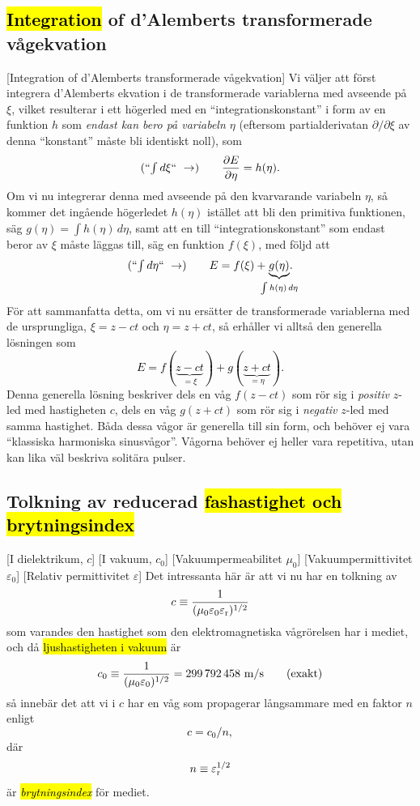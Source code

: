 \subsection{{\hl{Integration}} of d'Alemberts transformerade v{\aa}gekvation}
[Integration of d'Alemberts
  transformerade v{\aa}gekvation]
Vi v{\"a}ljer att f{\"o}rst integrera d'Alemberts ekvation i de transformerade
variablerna med avseende p{\aa} $\xi$, vilket resulterar i ett h{\"o}gerled med
en ``integrationskonstant'' i form av en funktion $h$ som {\it endast kan bero
p{\aa} variabeln $\eta$} (eftersom partialderivatan $\partial/\partial\xi$ av
denna ``konstant'' m{\aa}ste bli identiskt noll), som
\hl{$$
  (\hbox{``$\int d\xi$`` }\to)\qquad
  {{\partial E}\over{\partial\eta}}=h(\eta).
$$}
Om vi nu integrerar denna med avseende p{\aa} den kvarvarande variabeln $\eta$,
s{\aa} kommer det ing{\aa}ende h{\"o}gerledet $h(\eta)$ ist{\"a}llet att bli
den primitiva funktionen, s{\"a}g $g(\eta)=\int h(\eta)\,d\eta$, samt
att en till ``integrationskonstant'' som endast beror av $\xi$ m{\aa}ste
l{\"a}ggas till, s{\"a}g en funktion $f(\xi)$, med f{\"o}ljd att
\hl{$$
  (\hbox{``$\int d\eta$`` }\to)\qquad
  E=f(\xi)+\kern-7pt\underbrace{g(\eta)}_{\int h(\eta)\,d\eta}\kern-9pt.
$$}
F{\"o}r att sammanfatta detta, om vi nu ers{\"a}tter de transformerade
variablerna med de ursprungliga, $\xi=z-ct$ och $\eta=z+ct$, s{\aa}
erh{\aa}ller vi allts{\aa} den generella l{\"o}sningen som
\hl{$$
  E = f(\underbrace{z-ct}_{=\xi}) + g(\underbrace{z+ct}_{=\eta}).
$$}
Denna generella l{\"o}sning beskriver dels en v{\aa}g $f(z-ct)$ som r{\"o}r sig
i {\it positiv} $z$-led med hastigheten $c$, dels en v{\aa}g $g(z+ct)$ som
r{\"o}r sig i {\it negativ} $z$-led med samma hastighet. B{\aa}da dessa
v{\aa}gor {\"a}r generella till sin form, och beh{\"o}ver ej vara ``klassiska
harmoniska sinusv{\aa}gor''. V{\aa}gorna beh{\"o}ver ej heller vara repetitiva,
utan kan lika v{\"a}l beskriva solit{\"a}ra pulser.
\medskip

\subsection{Tolkning av reducerad {\hl{fashastighet och brytningsindex}}}
[I dielektrikum, $c$]
[I vakuum, $c_0$]
[Vakuumpermeabilitet $\mu_0$]
[Vakuumpermittivitet $\varepsilon_0$]
[Relativ permittivitet $\varepsilon$]
Det intressanta h{\"a}r {\"a}r att vi nu har en tolkning av
\hl{$$
  c \equiv {{1}\over{(\mu_0\varepsilon_0\varepsilon_{\rm r})^{1/2}}}
$$}
som varandes den hastighet som den elektromagnetiska v{\aa}gr{\"o}relsen har i
mediet, och d{\aa} {\hl{ljus\-hastig\-heten i vakuum}} {\"a}r
\hl{$$
  c_0 \equiv {{1}\over{(\mu_0\varepsilon_0)^{1/2}}}
      = 299\,792\,458\ {\rm m}/{\rm s}\qquad(\hbox{exakt})
$$}
s{\aa} inneb{\"a}r det att vi i $c$ har en v{\aa}g som propagerar
l{\aa}ngsammare med en faktor $n$ enligt
\hl{$$
  c = c_0/n,
$$}
d{\"a}r
\hl{$$
  n \equiv\varepsilon^{1/2}_{\rm r}
$$}
{\"a}r {\hl{{\it brytningsindex}}} f{\"o}r mediet.

